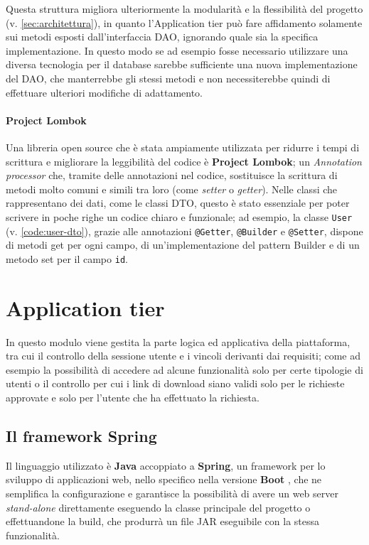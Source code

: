 

Questa struttura migliora ulteriormente la modularità e la flessibilità del
progetto (v. \autoref{sec:architettura}), in quanto l'Application tier può
fare affidamento solamente sui metodi esposti dall'interfaccia DAO, ignorando quale
sia la specifica implementazione.
In questo modo se ad esempio fosse necessario utilizzare una diversa tecnologia
per il database sarebbe sufficiente una nuova implementazione del DAO, che
manterrebbe gli stessi metodi e non necessiterebbe quindi di effettuare ulteriori
modifiche di adattamento.

\paragraph{Project Lombok}
Una libreria open source che è stata ampiamente utilizzata per ridurre i tempi di
scrittura e migliorare la leggibilità del codice è \textbf{Project Lombok};
un \textit{Annotation processor} che, tramite delle annotazioni nel codice,
sostituisce la scrittura di metodi molto comuni e simili tra loro (come
\textit{setter} o \textit{getter}).
Nelle classi che rappresentano dei dati, come le classi DTO, questo è stato
essenziale per poter scrivere in poche righe un codice chiaro e funzionale;
ad esempio, la classe \texttt{User} (v. \ref{code:user-dto}), grazie alle annotazioni
\texttt{@Getter}, \texttt{@Builder} e \texttt{@Setter}, dispone di metodi get
per ogni campo, di un'implementazione del pattern Builder e di un metodo set per
il campo \texttt{id}.





\section{Application tier}
In questo modulo viene gestita la parte logica ed applicativa della piattaforma,
tra cui il controllo della sessione utente e i vincoli derivanti dai requisiti;
come ad esempio la possibilità di accedere ad alcune funzionalità solo per certe
tipologie di utenti o il controllo per cui i link di download siano validi solo
per le richieste approvate e solo per l'utente che ha effettuato la richiesta. 


\subsection{Il framework Spring}
Il linguaggio utilizzato è \textbf{Java} accoppiato a \textbf{Spring},
un framework per lo sviluppo di applicazioni web, nello specifico nella versione
\textbf{Boot} \cite{spring:boot}, che ne semplifica la configurazione e garantisce
la possibilità di avere un web server \textit{stand-alone} direttamente eseguendo
la classe principale del progetto o effettuandone la build, che produrrà un file
JAR eseguibile con la stessa funzionalità.

